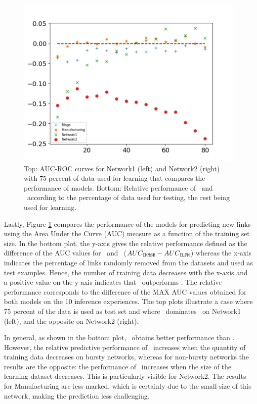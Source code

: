 \begin{figure}[ht!]
\begin{minipage}{0.5\textwidth}
        \includegraphics[width=\textwidth]{img/corpus/testset_max_20}
    \end{minipage}
    \caption{Top: AUC-ROC curves for Network1 (left) and Network2 (right) with 75 percent of data used for learning that compares the performance of models. Bottom: Relative performance of \imb\ and \ifm\ according to the percentage of data used for testing, the rest being used for learning.} 
\label{fig:auc}
\end{figure}

Lastly, Figure \ref{fig:auc} compares the performance of the models for predicting new links using the Area Under the Curve (AUC) measure as a function of the training set size. In the bottom plot, the y-axis gives the relative performance defined as the difference of the AUC values for \imb\ and \ifm\ ($AUC_{\texttt{IMMSB}} - AUC_{\texttt{ILFM}}$) whereas the x-axis indicates the percentage of links randomly removed from the datasets and used as test examples. Hence, the number of training data decreases with the x-axis and a positive value on the y-axis indicates that \imb\ outperforms \ifm.  The relative performance corresponds to the difference of the MAX AUC values obtained for both models on the 10 inference experiences. The top plots illustrate a case where 75 percent of the data is used as test set and where \imb\ dominates \ifm\ on Network1 (left), and the opposite on Network2 (right).

In general, as shown in the bottom plot, \ifm\ obtains better performance than \imb. However, the relative predictive performance of \imb\  increases  when the quantity of training data decreases on bursty networks, whereas for non-bursty networks the results are the opposite: the performance of \ifm\ increases when the size of the learning dataset decreases. This is particularly visible for Network2. The results for Manufacturing are less marked, which is certainly due to the small size of this network, making the prediction less challenging.


